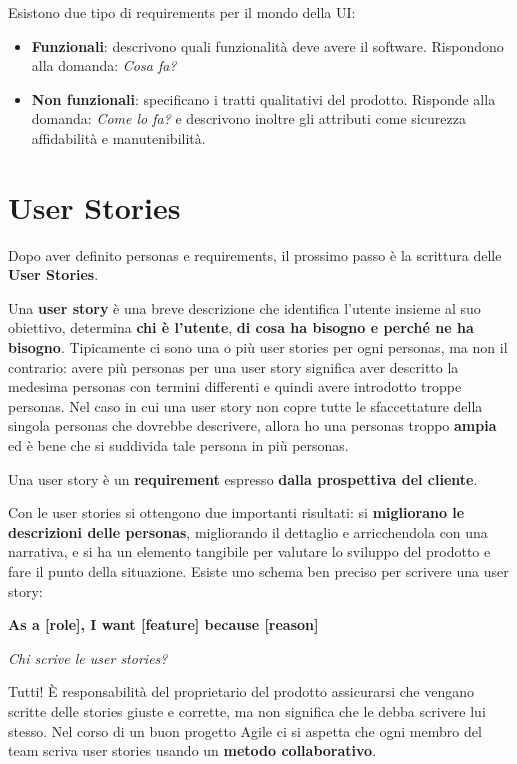 \documentclass[a4paper,11pt,oneside]{book}
\begin{document}
Esistono due tipo di requirements per il mondo della UI:

\begin{itemize}
	\item \textbf{Funzionali}:
	      descrivono quali funzionalità deve avere il software. Rispondono alla domanda:
	      \textit{Cosa fa?}
	\item \textbf{Non funzionali}: specificano i tratti qualitativi del prodotto. Risponde alla domanda: \textit{Come lo fa?} e descrivono inoltre gli
	      attributi come sicurezza affidabilità e manutenibilità.
\end{itemize}

\section{User Stories}
Dopo aver definito personas e requirements, il prossimo passo è la scrittura delle \textbf{User Stories}.

Una \textbf{user story} è una breve descrizione che identifica l'utente insieme al suo
obiettivo, determina \textbf{chi è l'utente}, \textbf{di cosa ha bisogno e perché ne ha bisogno}. Tipicamente ci sono una o più user stories per ogni personas, ma non il contrario: avere più personas per una user story significa aver descritto la medesima personas con termini differenti e quindi avere introdotto troppe personas.
Nel caso in cui una user story non copre tutte le sfaccettature della singola personas che dovrebbe descrivere, allora ho una personas troppo \textbf{ampia} ed è bene che si suddivida tale persona in più personas.

Una user story è un \textbf{requirement} espresso \textbf{dalla prospettiva del cliente}.

Con le user stories si ottengono due importanti risultati: si \textbf{migliorano le descrizioni delle personas}, migliorando il dettaglio e arricchendola con una narrativa, e si ha un elemento tangibile per valutare lo sviluppo del prodotto e fare il punto della situazione.
Esiste uno schema ben preciso per scrivere una user story:

\begin{center}
	\textbf{\large As a [role], I want [feature] because [reason]}
\end{center}

\begin{flushleft}
	\textit{Chi scrive le user stories?}
\end{flushleft}

Tutti! È responsabilità del proprietario del prodotto assicurarsi che vengano scritte delle stories giuste e corrette, ma non significa che le debba
scrivere lui stesso. Nel corso di un buon progetto Agile ci si aspetta che ogni membro del team scriva user stories usando un \textbf{metodo collaborativo}.
\end{document}
